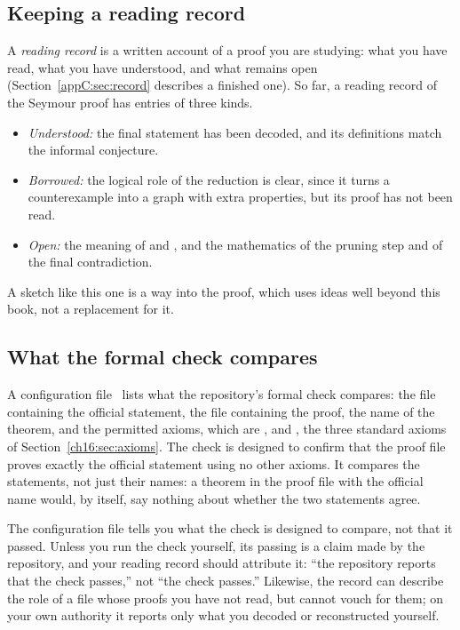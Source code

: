 \subsection*{Keeping a reading record}
A \emph{reading record} is a written account of a proof you are studying: what you have read, what you have understood, and what remains open (Section~\ref{appC:sec:record} describes a finished one). So far, a reading record of the Seymour proof has entries of three kinds.
\begin{itemize}
\item \emph{Understood:} the final statement has been decoded, and its definitions match the informal conjecture.
\item \emph{Borrowed:} the logical role of the reduction is clear, since it turns a counterexample into a graph with extra properties, but its proof has not been read.
\item \emph{Open:} the meaning of  and , and the mathematics of the pruning step and of the final contradiction.
\end{itemize}
A sketch like this one is a way into the proof, which uses ideas well beyond this book, not a replacement for it.

\subsection*{What the formal check compares}
A configuration file~\cite{oaiconfig} lists what the repository's formal check compares: the file containing the official statement, the file containing the proof, the name of the theorem, and the permitted axioms, which are ,  and , the three standard axioms of Section~\ref{ch16:sec:axioms}. The check is designed to confirm that the proof file proves exactly the official statement using no other axioms. It compares the statements, not just their names: a theorem in the proof file with the official name would, by itself, say nothing about whether the two statements agree.

The configuration file tells you what the check is designed to compare, not that it passed. Unless you run the check yourself, its passing is a claim made by the repository, and your reading record should attribute it: ``the repository reports that the check passes,'' not ``the check passes.'' Likewise, the record can describe the role of a file whose proofs you have not read, but cannot vouch for them; on your own authority it reports only what you decoded or reconstructed yourself.


